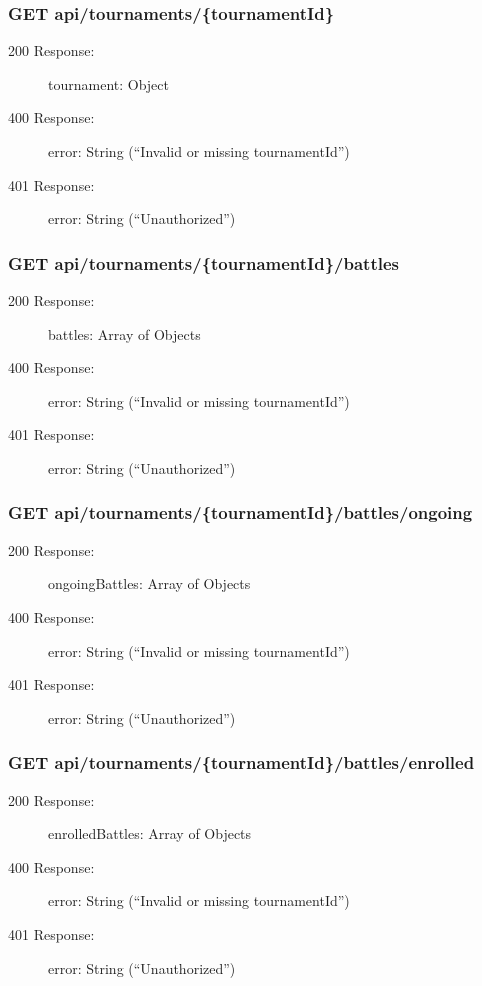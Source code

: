 \documentclass{Configuration_Files/Template}
\begin{document}
\subsubsection{GET api/tournaments/\{tournamentId\}}
\begin{description}
    \item[200 Response:] tournament: Object
    \item[400 Response:] error: String (“Invalid or missing tournamentId”)
    \item[401 Response:] error: String (“Unauthorized”)
\end{description}

\subsubsection{GET api/tournaments/\{tournamentId\}/battles}
\begin{description}
    \item[200 Response:] battles: Array of Objects
    \item[400 Response:] error: String (“Invalid or missing tournamentId”)
    \item[401 Response:] error: String (“Unauthorized”)
\end{description}

\subsubsection{GET api/tournaments/\{tournamentId\}/battles/ongoing}
\begin{description}
    \item[200 Response:] ongoingBattles: Array of Objects
    \item[400 Response:] error: String (“Invalid or missing tournamentId”)
    \item[401 Response:] error: String (“Unauthorized”)
\end{description}

\subsubsection{GET api/tournaments/\{tournamentId\}/battles/enrolled}
\begin{description}
    \item[200 Response:] enrolledBattles: Array of Objects
    \item[400 Response:] error: String (“Invalid or missing tournamentId”)
    \item[401 Response:] error: String (“Unauthorized”)
\end{description}
\end{document}
